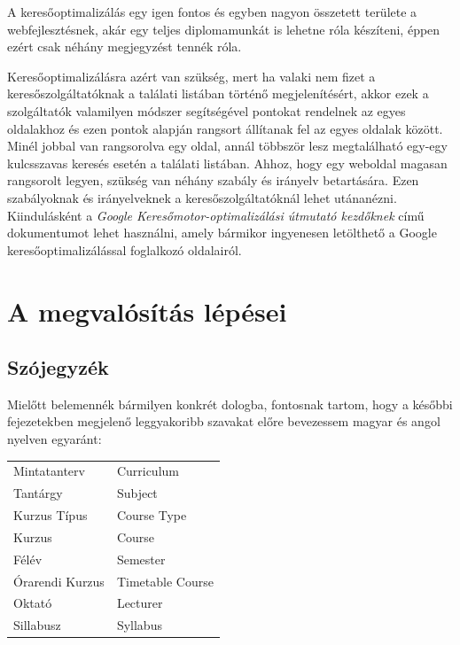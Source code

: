 \documentclass[hidelinks, 12pt, a4paper]{report}
\begin{document}
A keresőoptimalizálás egy igen fontos és egyben nagyon összetett területe a webfejlesztésnek, akár egy teljes diplomamunkát is lehetne róla készíteni, éppen ezért csak néhány megjegyzést tennék róla.

Keresőoptimalizálásra azért van szükség, mert ha valaki nem fizet a keresőszolgáltatóknak a találati listában történő megjelenítésért, akkor ezek a szolgáltatók valamilyen módszer segítségével pontokat rendelnek az egyes oldalakhoz és ezen pontok alapján rangsort állítanak fel az egyes oldalak között. Minél jobbal van rangsorolva egy oldal, annál többször lesz megtalálható egy-egy kulcsszavas keresés esetén a találati listában. Ahhoz, hogy egy weboldal magasan rangsorolt legyen, szükség van néhány szabály és irányelv betartására. Ezen szabályoknak és irányelveknek a keresőszolgáltatóknál lehet utánanézni. Kiindulásként a \emph{Google Keresőmotor-optimalizálási útmutató kezdőknek} című dokumentumot lehet használni, amely bármikor ingyenesen letölthető a Google keresőoptimalizálással foglalkozó oldalairól.


\chapter{A megvalósítás lépései}

\section{Szójegyzék}

Mielőtt belemennék bármilyen konkrét dologba, fontosnak tartom, hogy a későbbi fejezetekben megjelenő leggyakoribb szavakat előre bevezessem magyar és angol nyelven egyaránt:

\medskip

\begin{tabular}{ l | l }
Mintatanterv & Curriculum \\
Tantárgy & Subject \\
Kurzus Típus & Course Type \\
Kurzus & Course \\
Félév & Semester \\
Órarendi Kurzus & Timetable Course \\
Oktató & Lecturer \\
Sillabusz & Syllabus
\end{tabular}
\end{document}
